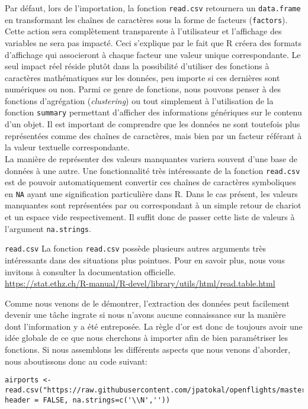 Par défaut, lors de l'importation, la fonction \texttt{read.csv} retournera un \texttt{data.frame} en transformant les chaînes de caractères sous la forme de facteurs (\texttt{factors}). Cette action sera complètement transparente à l'utilisateur et l'affichage des variables ne sera pas impacté. Ceci s'explique par le fait que R créera des formats d'affichage qui associeront à chaque facteur une valeur unique correspondante. Le seul impact réel réside plutôt dans la possibilité d'utiliser des fonctions à caractères mathématiques sur les données, peu importe si ces dernières sont numériques ou non. Parmi ce genre de fonctions, nous pouvons penser à des fonctions d'agrégation (\emph{clustering}) ou tout simplement à l'utilisation de la fonction \texttt{summary} \cite{Rfunction:summary} permettant d'afficher des informations génériques sur le contenu d'un objet. Il est important de comprendre que les données ne sont toutefois plus représentées comme des chaînes de caractères, mais bien par un facteur référant à la valeur textuelle correspondante. \\

La manière de représenter des valeurs manquantes variera souvent d'une base de données à une autre. Une fonctionnalité très intéressante de la fonction \texttt{read.csv} est de pouvoir automatiquement convertir ces chaînes de caractères symboliques en \texttt{NA} ayant une signification particulière dans R. Dans le cas présent, les valeurs manquantes sont représentées par  ou  correspondant à un simple retour de chariot et un espace vide respectivement. Il suffit donc de passer cette liste de valeurs à l'argument \texttt{na.strings}. \\

\begin{moreInfo}{\texttt{read.csv}}
	La fonction \texttt{read.csv} possède plusieurs autres arguments très intéressants dans des situations plus pointues. Pour en savoir plus, nous vous invitons à consulter la documentation officielle. \\
	\url{https://stat.ethz.ch/R-manual/R-devel/library/utils/html/read.table.html}
\end{moreInfo}

Comme nous venons de le démontrer, l'extraction des données peut facilement devenir une tâche ingrate si nous n'avons aucune connaissance sur la manière dont l'information y a été entreposée. La règle d'or est donc de toujours avoir une idée globale de ce que nous cherchons à importer afin de bien paramétriser les fonctions. Si nous assemblons les différents aspects que nous venons d'aborder, nous aboutissons donc au code suivant:
\begin{lstlisting}[caption = Extraction des données,label=src:Extraction]
	airports <- read.csv("https://raw.githubusercontent.com/jpatokal/openflights/master/data/airports.dat", header = FALSE, na.strings=c('\\N',''))
\end{lstlisting}